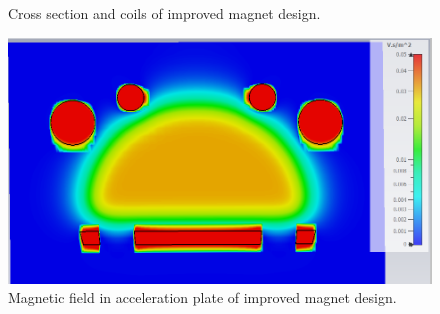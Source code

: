 \documentclass[a4paper,oneside,12pt]{report}
\numberwithin{equation}{chapter}
\begin{document}
\begin{figure}[H]
    \centering
    \qquad{}%
    \vspace{0pt}
    \caption{\centering Cross section and coils of improved magnet design.} 
    \label{fig:improved_magnet_design_cross_section}
    \vspace{5pt}
\end{figure}

\begin{figure}[H]
    \centering
    \includegraphics[width=.8\linewidth]{./figures/cst/cst_second_magnet_design4.png}
    \vspace{0pt}
    \caption{Magnetic field in acceleration plate of improved magnet design.}
    \label{fig:improved_magnet_design_B}
\end{figure}
\end{document}
